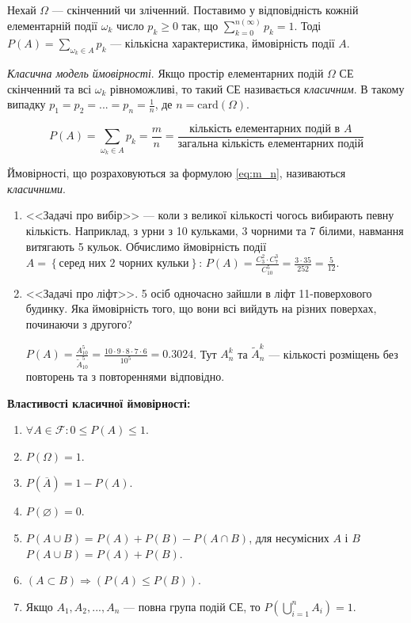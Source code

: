 Нехай $\Omega$ --- скінченний чи зліченний. 
Поставимо у відповідність кожній елементарній події $\omega_k$ число $p_k\geq 0$ так, що $\sum_{k=0}^{ n \left( \infty\right)}p_k = 1$.
Тоді $P(A) = \sum_{\omega_k \in A} p_k$ --- кількісна характеристика, ймовірність події $A$.

\begin{example}
    \emph{Класична модель ймовірності}. Якщо простір елементарних подій $\Omega$ СЕ скінченний
    та всі $\omega_k$ рівноможливі, то такий СЕ називається \emph{класичним}.
    В такому випадку $p_1 = p_2 = ... = p_n = \frac{1}{n}$, де $n = \mathrm{card}(\Omega)$.
    
    \begin{equation}\label{eq:m_n}
        P(A) = \sum_{\omega_k \in A} p_k = \frac{m}{n} = \frac{\text{кількість елементарних подій в } A}{\text{загальна кількість елементарних подій}}
    \end{equation}
\end{example}
Ймовірності, що розраховуються за формулою \eqref{eq:m_n}, називаються \emph{класичними}.
\begin{example}
    \begin{enumerate}
        \item <<Задачі про вибір>> --- коли з великої кількості чогось вибирають певну кількість.
        Наприклад, з урни з 10 кульками, 3 чорними та 7 білими, навмання витягають 5 кульок.
        Обчислимо ймовірність події $A = \left\{ \text{серед них 2 чорних кульки}\right\}$:
        $P(A) = \frac{C_3^2\cdot C_7^3}{C_{10}^5} = \frac{3\cdot 35}{252} = \frac{5}{12}$.
        \item <<Задачі про ліфт>>. 5 осіб одночасно зайшли в ліфт 11-поверхового будинку. 
        Яка ймовірність того, що вони всі вийдуть на різних поверхах, починаючи з другого?
        
        $P(A) = \frac{A_{10}^5}{\widetilde{A}_{10}^5} = \frac{10\cdot 9\cdot 8\cdot 7 \cdot 6}{10^5} = 0.3024$. 
        Тут $A_n^k$ та $\widetilde{A}_n^k$ --- кількості розміщень без повторень та з повтореннями відповідно.
    \end{enumerate}
\end{example}

\noindent \textbf{Властивості класичної ймовірності:}
\begin{enumerate}
    \item $\forall A \in \mathcal{F}: 0 \leq P(A) \leq 1$.
    \item $P(\Omega) = 1$.
    \item $P(\overline{A}) = 1 - P(A)$.
    \item $P(\varnothing) = 0$.
    \item $P(A\cup B) = P(A) + P(B) - P(A\cap B)$, для несумісних $A$ і $B$ $P(A\cup B) = P(A) + P(B)$.
    \item $\left( A \subset B\right) \Rightarrow \left( P(A) \leq P(B)\right)$.
    \item Якщо $A_1, A_2, ..., A_n$ --- повна група подій СЕ, то $P(\bigcup_{i=1}^{n} A_i) = 1$.
\end{enumerate}